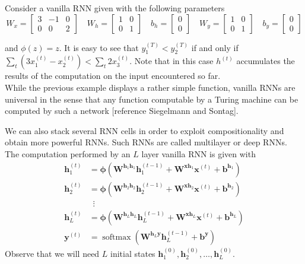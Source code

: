 \documentclass[titlepage]{report}
\DeclareMathOperator{\softmax}{softmax}
\newenvironment{example*}[1][]
	{
	\par\addvspace{9pt}%
	\noindent%
	\uline{\textbf{Example%
	\ifthenelse{\isempty{#1}}%
		{}%
		{ (#1)}%
	}}%
	\hspace{5pt}%
	\ignorespaces%
	}
	{%
	\par\addvspace{9pt}%
	}
\begin{document}
\begin{example*}
Consider a vanilla RNN given with the following parameters
\begin{equation*}
W_x = \begin{bmatrix} 3 & -1 & 0 \\ 0 & 0 & 2 \end{bmatrix} \quad
W_h = \begin{bmatrix} 1 & 0 \\ 0 & 1 \end{bmatrix} \quad
b_h = \begin{bmatrix} 0 \\ 0 \end{bmatrix} \quad
W_y = \begin{bmatrix} 1 & 0 \\ 0 & 1 \end{bmatrix} \quad
b_y = \begin{bmatrix} 0 \\ 0 \end{bmatrix}
\end{equation*}
\end{example*}

\noindent
and $\phi(z) = z$. It is easy to see that $y_1^{(T)} < y_2^{(T)}$ if and only if $\sum_t ( 3 x_1^{(t)} - x_2^{(t)} ) < \sum_t 2 x_3^{(t)}$. Note that in this case $h^{(t)}$ accumulates the results of the computation on the input encountered so far. \\

While the previous example displays a rather simple function, vanilla RNNs are universal in the sense that any function computable by a Turing machine can be computed by such a network [reference Siegelmann and Sontag].

We can also stack several RNN cells in order to exploit compositionality and obtain more powerful RNNs. Such RNNs are called multilayer or deep RNNs. The computation performed by an $L$ layer vanilla RNN is given with
\begin{align*}
\mathbf{h}_1^{(t)} &= \boldsymbol{\phi} \left( \mathbf{W}^{\mathbf{h}_1 \mathbf{h}_1} \mathbf{h}_1^{(t - 1)} + \mathbf{W}^{\mathbf{x} \mathbf{h}_1} \mathbf{x}^{(t)} + \mathbf{b}^{\mathbf{h}_1} \right) \\
\mathbf{h}_2^{(t)} &= \boldsymbol{\phi} \left( \mathbf{W}^{\mathbf{h}_2 \mathbf{h}_2} \mathbf{h}_2^{(t - 1)} + \mathbf{W}^{\mathbf{x} \mathbf{h}_2} \mathbf{x}^{(t)} + \mathbf{b}^{\mathbf{h}_2} \right) \\
& \enspace \vdots \\
\mathbf{h}_L^{(t)} &= \boldsymbol{\phi} \left( \mathbf{W}^{\mathbf{h}_L \mathbf{h}_L} \mathbf{h}_L^{(t - 1)} + \mathbf{W}^{\mathbf{x} \mathbf{h}_L} \mathbf{x}^{(t)} + \mathbf{b}^{\mathbf{h}_L} \right) \\
\mathbf{y}^{(t)} &= \softmax \left( \mathbf{W}^{\mathbf{h}_L \mathbf{y}} \mathbf{h}_L^{(t - 1)} + \mathbf{b}^{\mathbf{y}} \right)
\end{align*}
Observe that we will need $L$ initial states $\mathbf{h}_1^{(0)}, \mathbf{h}_2^{(0)}, \ldots, \mathbf{h}_L^{(0)}$.
\end{document}
